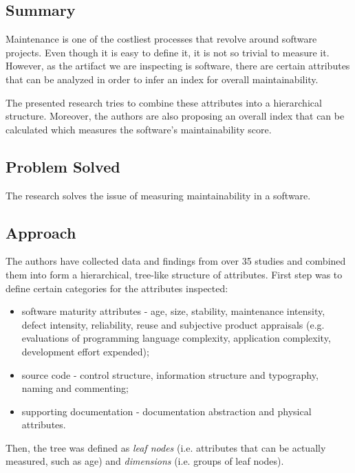 \documentclass[a4paper,portrait,12pt]{article}
\begin{document}
\subsection{Summary}

Maintenance is one of the costliest processes that revolve around software projects.
Even though it is easy to define it, it is not so trivial to measure it. However, 
as the artifact we are inspecting is software, there are certain attributes that 
can be analyzed in order to infer an index for overall maintainability. 

The presented research tries to combine these attributes into a hierarchical structure.
Moreover, the authors are also proposing an overall index that can be calculated 
which measures the software's maintainability score.

\subsection{Problem Solved}

The research solves the issue of measuring maintainability in a software. 

\subsection{Approach}

The authors have collected data and findings from over 35 studies and combined
them into form a hierarchical, tree-like structure of attributes. First step was to
define certain categories for the attributes inspected:

\begin{itemize}
  \item software maturity attributes - age, size, stability, maintenance intensity,
    defect intensity, reliability, reuse and subjective product appraisals (e.g.  
    evaluations of programming language complexity, application complexity, 
    development effort expended);
  \item source code - control structure, information structure and typography, 
    naming and commenting;
  \item supporting documentation - documentation abstraction and physical attributes.
\end{itemize}

Then, the tree was defined as \emph{leaf nodes} (i.e. attributes that can be 
actually measured, such as age) and \emph{dimensions} (i.e. groups of leaf nodes).
\end{document}
